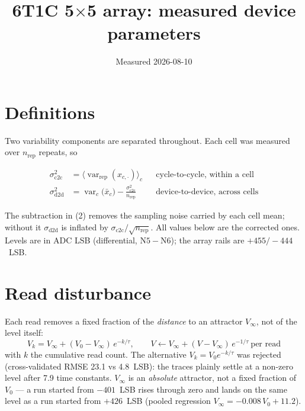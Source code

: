 \documentclass[11pt]{article}
\title{6T1C 5$\times$5 array: measured device parameters}
\author{}
\date{Measured 2026-08-10}
\newcommand{\dtod}{$\sigma_\mathrm{d2d}$}
\begin{document}
\maketitle

\section*{Definitions}

Two variability components are separated throughout. Each cell was measured
over $n_\mathrm{rep}$ repeats, so

\begin{align}
  \sigma_\mathrm{c2c}^2 &= \Big\langle \operatorname{var}_\mathrm{rep}(x_{c,\cdot}) \Big\rangle_c
  && \text{cycle-to-cycle, within a cell} \\
  \sigma_\mathrm{d2d}^2 &= \operatorname{var}_c\!\big(\bar{x}_c\big)
     - \frac{\sigma_\mathrm{c2c}^2}{n_\mathrm{rep}}
  && \text{device-to-device, across cells}
\end{align}

The subtraction in (2) removes the sampling noise carried by each cell mean;
without it \dtod{} is inflated by $\sigma_\mathrm{c2c}/\sqrt{n_\mathrm{rep}}$.
All values below are the corrected ones. Levels are in ADC LSB (differential,
$\mathrm{N5}-\mathrm{N6}$); the array rails are $+455/-444$~LSB.

\section*{Read disturbance}

Each read removes a fixed fraction of the \emph{distance} to an attractor
$V_\infty$, not of the level itself:
%
\begin{equation}
  V_k = V_\infty + (V_0 - V_\infty)\,e^{-k/\tau},
  \qquad
  V \leftarrow V_\infty + (V - V_\infty)\,e^{-1/\tau}\ \text{per read}
\end{equation}
%
with $k$ the cumulative read count. The alternative $V_k = V_0 e^{-k/\tau}$
was rejected (cross-validated RMSE 23.1 vs 4.8~LSB): the traces plainly
settle at a non-zero level after 7.9 time constants. $V_\infty$ is an
\emph{absolute} attractor, not a fixed fraction of $V_0$ --- a run started
from $-401$~LSB rises through zero and lands on the same level as a run
started from $+426$~LSB (pooled regression $V_\infty = -0.008\,V_0 + 11.2$).
\end{document}

